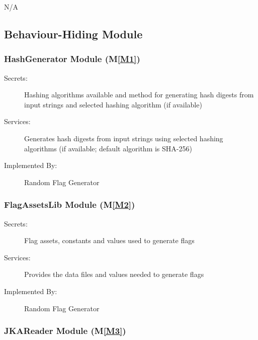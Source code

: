 \documentclass[12pt, titlepage]{article}
\newcommand{\mref}[1]{M\ref{#1}}
\begin{document}
N/A


\subsection{Behaviour-Hiding Module}

\subsubsection{HashGenerator Module (\mref{M1})}

\begin{description}
\item[Secrets:] Hashing algorithms available and method for generating hash
  digests from input strings and selected hashing algorithm (if available)
\item[Services:] Generates hash digests from input strings using selected
  hashing algorithms (if available; default algorithm is SHA-256)
\item[Implemented By:] Random Flag Generator
\end{description}

\subsubsection{FlagAssetsLib Module (\mref{M2})}

\begin{description}
\item[Secrets:] Flag assets, constants and values used to generate flags
\item[Services:] Provides the data files and values needed to generate flags
\item[Implemented By:] Random Flag Generator
\end{description}

\subsubsection{JKAReader Module (\mref{M3})}
\end{document}
